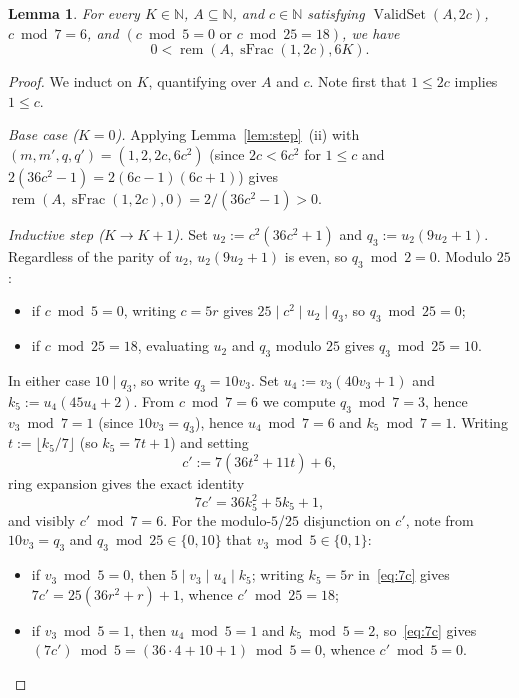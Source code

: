 \documentclass[11pt,a4paper]{amsart}
\newtheorem{lemma}{Lemma}
\newcommand{\rem}{\operatorname{rem}}
\newcommand{\ValidSet}{\operatorname{ValidSet}}
\newcommand{\sFrac}{\operatorname{sFrac}}
\begin{document}
\begin{lemma}\label{lem:six}
For every $K \in \mathbb{N}$, $A \subseteq \mathbb{N}$, and $c \in \mathbb{N}$ satisfying $\ValidSet(A, 2 c)$, $c \bmod 7 = 6$, and $(c \bmod 5 = 0 \text{ or } c \bmod 25 = 18)$, we have
\[
0 < \rem(A, \sFrac(1, 2 c), 6 K).
\]
\end{lemma}

\begin{proof}
We induct on $K$, quantifying over $A$ and $c$. Note first that $1 \le 2 c$ implies $1 \le c$.

\emph{Base case ($K = 0$).} Applying Lemma~\ref{lem:step}~(ii) with $(m, m', q, q') = (1, 2, 2 c, 6 c^2)$ (since $2 c < 6 c^2$ for $1 \le c$ and $2(36 c^2 - 1) = 2(6 c - 1)(6 c + 1)$) gives $\rem(A, \sFrac(1, 2 c), 0) = 2 / (36 c^2 - 1) > 0$.

\emph{Inductive step ($K \to K + 1$).} Set $u_2 := c^2 (36 c^2 + 1)$ and $q_3 := u_2 (9 u_2 + 1)$. Regardless of the parity of $u_2$, $u_2 (9 u_2 + 1)$ is even, so $q_3 \bmod 2 = 0$. Modulo $25$:
\begin{itemize}
\item if $c \bmod 5 = 0$, writing $c = 5 r$ gives $25 \mid c^2 \mid u_2 \mid q_3$, so $q_3 \bmod 25 = 0$;
\item if $c \bmod 25 = 18$, evaluating $u_2$ and $q_3$ modulo $25$ gives $q_3 \bmod 25 = 10$.
\end{itemize}
In either case $10 \mid q_3$, so write $q_3 = 10 v_3$. Set $u_4 := v_3 (40 v_3 + 1)$ and $k_5 := u_4 (45 u_4 + 2)$. From $c \bmod 7 = 6$ we compute $q_3 \bmod 7 = 3$, hence $v_3 \bmod 7 = 1$ (since $10 v_3 = q_3$), hence $u_4 \bmod 7 = 6$ and $k_5 \bmod 7 = 1$. Writing $t := \lfloor k_5 / 7 \rfloor$ (so $k_5 = 7 t + 1$) and setting
\[
c' := 7 (36 t^2 + 11 t) + 6,
\]
ring expansion gives the exact identity
\begin{equation}\label{eq:7c}
7 c' = 36 k_5^2 + 5 k_5 + 1,
\end{equation}
and visibly $c' \bmod 7 = 6$. For the modulo-$5$/$25$ disjunction on $c'$, note from $10 v_3 = q_3$ and $q_3 \bmod 25 \in \{0, 10\}$ that $v_3 \bmod 5 \in \{0, 1\}$:
\begin{itemize}
\item if $v_3 \bmod 5 = 0$, then $5 \mid v_3 \mid u_4 \mid k_5$; writing $k_5 = 5 r$ in~\eqref{eq:7c} gives $7 c' = 25(36 r^2 + r) + 1$, whence $c' \bmod 25 = 18$;
\item if $v_3 \bmod 5 = 1$, then $u_4 \bmod 5 = 1$ and $k_5 \bmod 5 = 2$, so~\eqref{eq:7c} gives $(7 c') \bmod 5 = (36 \cdot 4 + 10 + 1) \bmod 5 = 0$, whence $c' \bmod 5 = 0$.
\end{itemize}


\end{proof}
\end{document}
